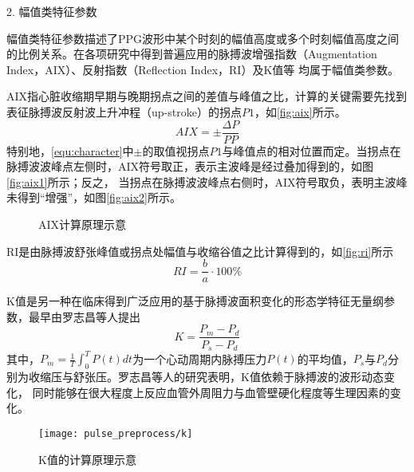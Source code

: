 2. 幅值类特征参数

幅值类特征参数描述了PPG波形中某个时刻的幅值高度或多个时刻幅值高度之间的比例关系。在各项研究中得到普遍应用的脉搏波增强指数（Augmentation Index，AIX）、反射指数（Reflection Index，RI）及K值等
均属于幅值类参数。

AIX指心脏收缩期早期与晚期拐点之间的差值与峰值之比，计算的关键需要先找到表征脉搏波反射波上升冲程（up-stroke）的拐点$P1$，如\autoref{fig:aix}所示\cite{Su2014}。
\begin{equation}
    \label{equ:aix}
    AIX = \pm \frac{\Delta P}{PP}
\end{equation}
特别地，\autoref{equ:character}中$\pm$的取值视拐点$P1$与峰值点的相对位置而定。当拐点在脉搏波波峰点左侧时，AIX符号取正，表示主波峰是经过叠加得到的，如图\autoref{fig:aix1}所示；反之，
当拐点在脉搏波波峰点右侧时，AIX符号取负，表明主波峰未得到“增强”，如图\autoref{fig:aix2}所示。
\begin{figure}[htbp]
    \centering
    \quad
    \caption[AIX计算原理示意]{\label{fig:aix}AIX计算原理示意\cite{Su2014}}
\end{figure}

RI是由脉搏波舒张峰值或拐点处幅值与收缩谷值之比计算得到的，如\autoref{fig:ri}所示\cite{Su2014,Elgendi2012}
\begin{equation}
    \label{equ:ri}
    RI = \frac{b}{a} \cdot 100\%
\end{equation}

K值是另一种在临床得到广泛应用的基于脉搏波面积变化的形态学特征无量纲参数，最早由罗志昌等人提出\cite{Luo1988,PPGYY}
\begin{equation}
    \label{equ:ppgk}
    K=\frac{P_m-P_d}{P_s-P_d}
\end{equation}
其中，$P_m=\frac{1}{T}\int_{0}^{T}P(t)dt$为一个心动周期内脉搏压力$P(t)$的平均值，$P_s$与$P_d$分别为收缩压与舒张压。罗志昌等人的研究表明，K值依赖于脉搏波的波形动态变化，
同时能够在很大程度上反应血管外周阻力与血管壁硬化程度等生理因素的变化。
\begin{figure}[htbp]
    \centering
    \texttt{[image: pulse\_preprocess/k]}
    \caption{\label{fig:k}K值的计算原理示意}
\end{figure}

